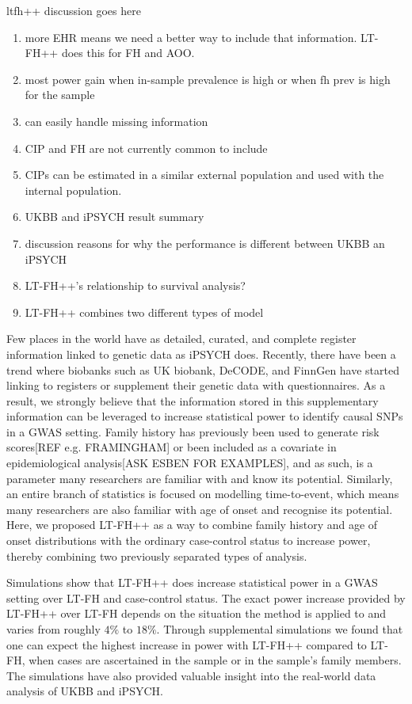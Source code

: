 ltfh++ discussion goes here

\begin{enumerate}
	\item more EHR means we need a better way to include that information. LT-FH++ does this for FH and AOO.
	\item most power gain when in-sample prevalence is high or when fh prev is high for the sample
	\item can easily handle missing information
	\item CIP and FH are not currently common to include
	\item CIPs can be estimated in a similar external population and used with the internal population.
	\item UKBB and iPSYCH result summary
	\item discussion reasons for why the performance is different between UKBB an iPSYCH
	\item LT-FH++'s relationship to survival analysis?
	\item LT-FH++ combines two different types of model
\end{enumerate}


Few places in the world have as detailed, curated, and complete register information linked to genetic data as iPSYCH does. Recently, there have been a trend where biobanks such as UK biobank, DeCODE, and FinnGen have started linking to registers or supplement their genetic data with questionnaires. As a result, we strongly believe that the information stored in this supplementary information can be leveraged to increase statistical power to identify causal SNPs in a GWAS setting. Family history has previously been used to generate risk scores[REF e.g. FRAMINGHAM] or been included as a covariate in epidemiological analysis[ASK ESBEN FOR EXAMPLES], and as such, is a parameter many researchers are familiar with and know its potential. Similarly, an entire branch of statistics is focused on modelling time-to-event, which means many researchers are also familiar with age of onset and recognise its potential. Here, we proposed LT-FH++ as a way to combine family history and age of onset distributions with the ordinary case-control status to increase power, thereby combining two previously separated types of analysis.

Simulations show that LT-FH++ does increase statistical power in a GWAS setting over LT-FH and case-control status. The exact power increase provided by LT-FH++ over LT-FH depends on the situation the method is applied to and varies from roughly $ 4\% $ to $ 18\% $. Through supplemental simulations we found that one can expect the highest increase in power with LT-FH++ compared to LT-FH, when cases are ascertained in the sample or in the sample's family members. The simulations have also provided valuable insight into the real-world data analysis of UKBB and iPSYCH.


